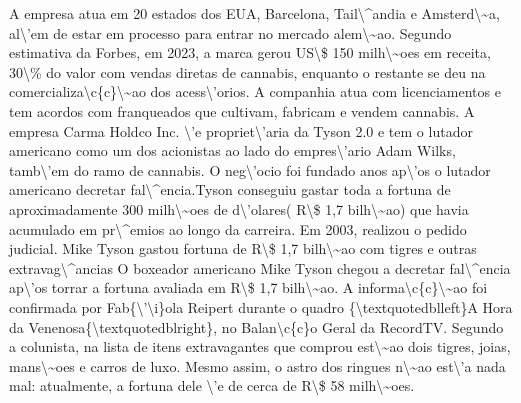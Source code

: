 \documentclass{article}%
\begin{document}
\newline%
A empresa atua em 20 estados dos EUA, Barcelona, Tail\textbackslash{}\^{}andia e Amsterd\textbackslash{}\textasciitilde{}a, al\textbackslash{}'em de estar em processo para entrar no mercado alem\textbackslash{}\textasciitilde{}ao. Segundo estimativa da Forbes, em 2023, a marca gerou US\textbackslash{}\$ 150 milh\textbackslash{}\textasciitilde{}oes em receita, 30\textbackslash{}\% do valor com vendas diretas de cannabis, enquanto o restante se deu na comercializa\textbackslash{}c\{c\}\textbackslash{}\textasciitilde{}ao dos acess\textbackslash{}'orios.\newline%
\newline%
A companhia atua com licenciamentos e tem acordos com franqueados que cultivam, fabricam e vendem cannabis. A empresa Carma Holdco Inc. \textbackslash{}'e propriet\textbackslash{}'aria da Tyson 2.0 e tem o lutador americano como um dos acionistas ao lado do empres\textbackslash{}'ario Adam Wilks, tamb\textbackslash{}'em do ramo de cannabis.\newline%
\newline%
O neg\textbackslash{}'ocio foi fundado anos ap\textbackslash{}'os o lutador americano decretar fal\textbackslash{}\^{}encia.Tyson conseguiu gastar toda a fortuna de aproximadamente 300 milh\textbackslash{}\textasciitilde{}oes de d\textbackslash{}'olares( R\textbackslash{}\$ 1,7 bilh\textbackslash{}\textasciitilde{}ao) que havia acumulado em pr\textbackslash{}\^{}emios ao longo da carreira. Em 2003, realizou o pedido judicial. Mike Tyson gastou fortuna de R\textbackslash{}\$ 1,7 bilh\textbackslash{}\textasciitilde{}ao com tigres e outras extravag\textbackslash{}\^{}ancias\newline%
\newline%
O boxeador americano Mike Tyson chegou a decretar fal\textbackslash{}\^{}encia ap\textbackslash{}'os torrar a fortuna avaliada em R\textbackslash{}\$ 1,7 bilh\textbackslash{}\textasciitilde{}ao. A informa\textbackslash{}c\{c\}\textbackslash{}\textasciitilde{}ao foi confirmada por Fab\{\textbackslash{}'\textbackslash{}i\}ola Reipert durante o quadro \{\textbackslash{}textquotedblleft\}A Hora da Venenosa\{\textbackslash{}textquotedblright\}, no Balan\textbackslash{}c\{c\}o Geral da RecordTV.\newline%
\newline%
Segundo a colunista, na lista de itens extravagantes que comprou est\textbackslash{}\textasciitilde{}ao dois tigres, joias, mans\textbackslash{}\textasciitilde{}oes e carros de luxo. Mesmo assim, o astro dos ringues n\textbackslash{}\textasciitilde{}ao est\textbackslash{}'a nada mal: atualmente, a fortuna dele \textbackslash{}'e de cerca de R\textbackslash{}\$ 58 milh\textbackslash{}\textasciitilde{}oes.\newline%
\end{document}

